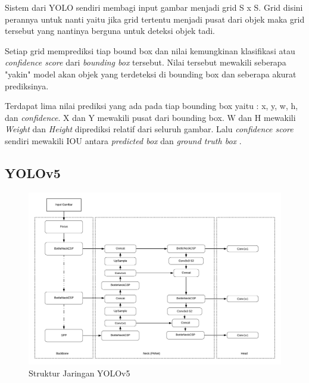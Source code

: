 \par Sistem dari YOLO sendiri membagi input gambar menjadi grid S x S. Grid disini perannya untuk 
nanti yaitu jika grid tertentu menjadi pusat dari objek maka grid tersebut yang nantinya berguna untuk deteksi objek tadi.

\par Setiap grid memprediksi tiap bound box dan nilai kemungkinan klasifikasi atau \emph{confidence score} dari \emph{bounding box} tersebut.
Nilai tersebut mewakili seberapa "yakin" model akan objek yang terdeteksi di bounding box dan seberapa akurat
prediksinya. 

\par Terdapat lima nilai prediksi yang ada pada tiap bounding box yaitu : x, y, w, h, dan \emph{confidence}.
X dan Y mewakili pusat dari bounding box. W dan H mewakili \emph{Weight} dan \emph{Height} diprediksi relatif
dari seluruh gambar. Lalu \emph{confidence score} sendiri mewakili IOU antara \emph{predicted box} dan \emph{ground truth box} \cite{redmon2016you}.

\subsection{YOLOv5}
\label{subsec:yolov5}

\begin{figure}[ht]
    \centering
    \includegraphics[width=1.0\textwidth]{gambar/yolov5 structure.png}
    \caption{Struktur Jaringan YOLOv5}
    \label{fig:yolov5network}  
\end{figure}

